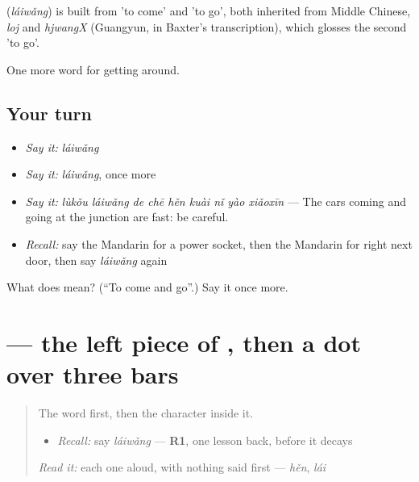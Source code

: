 \begin{cousinweb}
\textbf{} (\emph{láiwǎng}) is built from  'to come' and  'to go', both inherited from Middle Chinese, \emph{loj} and \emph{hjwangX} (Guangyun, in Baxter's transcription), which glosses the second 'to go'.
\end{cousinweb}

\begin{grammarlens}[title={What you've built}]
One more word for getting around.
\end{grammarlens}

\subsection*{Your turn}
\begin{itemize}
\raggedright
  \item \emph{Say it:} \emph{láiwǎng}
  \item \emph{Say it:} \emph{láiwǎng}, once more
  \item \emph{Say it:} \emph{lùkǒu láiwǎng de chē hěn kuài nǐ yào xiǎoxīn} — The cars coming and going at the junction are fast: be careful.
  \item \emph{Recall:} say the Mandarin for a power socket, then the Mandarin for right next door, then say \emph{láiwǎng} again
\end{itemize}

\begin{tcolorbox}[breakable,colback=teal!4,colframe=teal!35!black,title={Before you move on}]
What does  mean? (\textquotedblleft{}To come and go\textquotedblright{}.) Say it once more.
\end{tcolorbox}
\section[\texorpdfstring{\zh{往} (wǎng)}{往 (wǎng)}]{ — the left piece of , then a dot over three bars}

\label{lesson:ZH-W427-wang-toward}



\begin{quote}
The word first, then the character inside it.

\begin{itemize}
\raggedright
  \item \emph{Recall:} say \emph{láiwǎng} — \textbf{R1}, one lesson back, before it decays
\end{itemize}

\begin{quote}
 
\end{quote}

\emph{Read it:} each one aloud, with nothing said first — \emph{hěn}, \emph{lái}
\end{quote}

